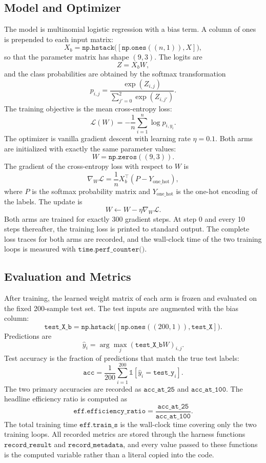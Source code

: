 \documentclass[10pt]{article}
\begin{document}
\subsection{Model and Optimizer}
The model is multinomial logistic regression with a bias term. A column of ones is prepended to each input matrix:
\[
X_b = \texttt{np.hstack}\bigl([\texttt{np.ones}((n,1)), X]\bigr),
\]
so that the parameter matrix has shape \((9, 3)\). The logits are
\[
Z = X_b W,
\]
and the class probabilities are obtained by the softmax transformation
\[
p_{i,j} = \frac{\exp(Z_{i,j})}{\sum_{j'=0}^{2} \exp(Z_{i,j'})}.
\]
The training objective is the mean cross-entropy loss:
\[
\mathcal{L}(W) = -\frac{1}{n} \sum_{i=1}^{n} \log p_{i, y_i}.
\]
The optimizer is vanilla gradient descent with learning rate \(\eta = 0.1\). Both arms are initialized with exactly the same parameter values:
\[
W = \texttt{np.zeros}((9, 3)).
\]
The gradient of the cross-entropy loss with respect to \(W\) is
\[
\nabla_W \mathcal{L}
= \frac{1}{n} X_b^\top (P - Y_{\mathrm{one\_hot}}),
\]
where \(P\) is the softmax probability matrix and \(Y_{\mathrm{one\_hot}}\) is the one-hot encoding of the labels. The update is
\[
W \leftarrow W - \eta \nabla_W \mathcal{L}.
\]
Both arms are trained for exactly 300 gradient steps. At step 0 and every 10 steps thereafter, the training loss is printed to standard output. The complete loss traces for both arms are recorded, and the wall-clock time of the two training loops is measured with \(\texttt{time.perf\_counter()}\).

\subsection{Evaluation and Metrics}
After training, the learned weight matrix of each arm is frozen and evaluated on the fixed 200-sample test set. The test inputs are augmented with the bias column:
\[
\texttt{test\_X\_b} = \texttt{np.hstack}\bigl([\texttt{np.ones}((200,1)), \texttt{test\_X}]\bigr).
\]
Predictions are
\[
\hat{y}_i = \arg\max_{j} (\texttt{test\_X\_b} W)_{i,j}.
\]
Test accuracy is the fraction of predictions that match the true test labels:
\[
\texttt{acc} = \frac{1}{200} \sum_{i=1}^{200} \mathbb{1}[\hat{y}_i = \texttt{test\_y}_i].
\]
The two primary accuracies are recorded as \(\texttt{acc\_at\_25}\) and \(\texttt{acc\_at\_100}\). The headline efficiency ratio is computed as
\[
\texttt{eff.efficiency\_ratio} = \frac{\texttt{acc\_at\_25}}{\texttt{acc\_at\_100}}.
\]
The total training time \(\texttt{eff.train\_s}\) is the wall-clock time covering only the two training loops. All recorded metrics are stored through the harness functions \(\texttt{record\_result}\) and \(\texttt{record\_metadata}\), and every value passed to these functions is the computed variable rather than a literal copied into the code.
\end{document}
